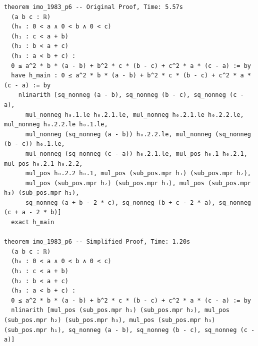 \begin{tcolorbox}[colback=lightblue, boxrule=0pt, arc=5pt, outer arc=5pt, after skip=10pt plus 2pt]
\begin{lstlisting}[caption={Example of Speedup after Simplification (orig: 5.6s, new: 1.2s)},label={lst:minif2f-speedup-1}, captionpos=t, language=lean, breaklines=true, style=mystyle]
theorem imo_1983_p6 -- Original Proof, Time: 5.57s
  (a b c : ℝ)
  (h₀ : 0 < a ∧ 0 < b ∧ 0 < c)
  (h₁ : c < a + b)
  (h₂ : b < a + c)
  (h₃ : a < b + c) :
  0 ≤ a^2 * b * (a - b) + b^2 * c * (b - c) + c^2 * a * (c - a) := by
  have h_main : 0 ≤ a^2 * b * (a - b) + b^2 * c * (b - c) + c^2 * a * (c - a) := by
    nlinarith [sq_nonneg (a - b), sq_nonneg (b - c), sq_nonneg (c - a),
      mul_nonneg h₀.1.le h₀.2.1.le, mul_nonneg h₀.2.1.le h₀.2.2.le, mul_nonneg h₀.2.2.le h₀.1.le,
      mul_nonneg (sq_nonneg (a - b)) h₀.2.2.le, mul_nonneg (sq_nonneg (b - c)) h₀.1.le,
      mul_nonneg (sq_nonneg (c - a)) h₀.2.1.le, mul_pos h₀.1 h₀.2.1, mul_pos h₀.2.1 h₀.2.2,
      mul_pos h₀.2.2 h₀.1, mul_pos (sub_pos.mpr h₁) (sub_pos.mpr h₂),
      mul_pos (sub_pos.mpr h₂) (sub_pos.mpr h₃), mul_pos (sub_pos.mpr h₃) (sub_pos.mpr h₁),
      sq_nonneg (a + b - 2 * c), sq_nonneg (b + c - 2 * a), sq_nonneg (c + a - 2 * b)]
  exact h_main

theorem imo_1983_p6 -- Simplified Proof, Time: 1.20s
  (a b c : ℝ)
  (h₀ : 0 < a ∧ 0 < b ∧ 0 < c)
  (h₁ : c < a + b)
  (h₂ : b < a + c)
  (h₃ : a < b + c) :
  0 ≤ a^2 * b * (a - b) + b^2 * c * (b - c) + c^2 * a * (c - a) := by
  nlinarith [mul_pos (sub_pos.mpr h₁) (sub_pos.mpr h₂), mul_pos (sub_pos.mpr h₂) (sub_pos.mpr h₃), mul_pos (sub_pos.mpr h₃) (sub_pos.mpr h₁), sq_nonneg (a - b), sq_nonneg (b - c), sq_nonneg (c - a)]
\end{lstlisting}
\end{tcolorbox}

